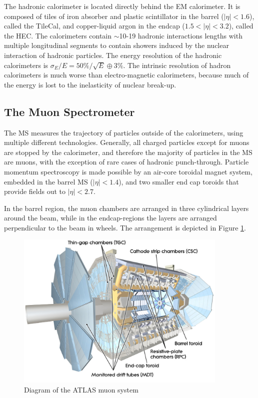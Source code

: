 The hadronic calorimeter is located directly behind the EM calorimeter. It is composed of tiles of iron absorber and plastic scintillator  in the barrel ($|\eta| < 1.6$), called the TileCal,  and copper-liquid argon in the endcap ($1.5<|\eta| <3.2$), called the HEC. The calorimeters contain $\sim$10-19 hadronic interactions lengths with multiple longitudinal segments to contain showers induced by the nuclear interaction of hadronic particles. The energy resolution of the hadronic calorimeters is $\sigma_E/E = 50\%/\sqrt{E}\oplus3\%$. The intrinsic resolution of hadron calorimeters is much worse than electro-magnetic calorimeters, because much of the energy is lost to the inelasticity of nuclear break-up. 

\subsection{The Muon Spectrometer} 

The MS measures the trajectory of particles outside of the calorimeters, using multiple different technologies. Generally, all charged particles except for muons are stopped by the calorimeter, and therefore the majority of particles in the MS are muons, with the exception of rare cases of hadronic punch-through. Particle momentum spectroscopy is made possible by an air-core toroidal magnet system, embedded in the barrel MS ($|\eta| < 1.4$), and two smaller end cap toroids that provide fields out to $|\eta| < 2.7$. 

In the barrel region, the muon chambers are arranged in three cylindrical layers around the beam, while in the endcap-regions the layers are arranged perpendicular to the beam in wheels. The arrangement is depicted in Figure \ref{figure:lhc_muon}.

\begin{figure}
\centering 
\includegraphics[width=0.9\textwidth]{figs/lhc/MuonSystem-eps-converted-to}
\caption{Diagram of the ATLAS muon system}
\label{figure:lhc_muon}
\end{figure}

